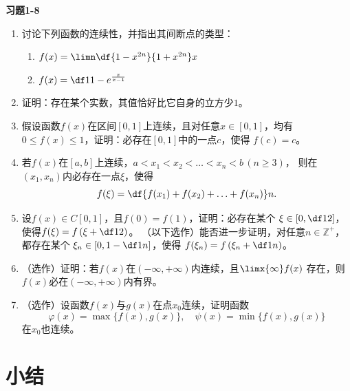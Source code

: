 \begin{ext}
	{\centering\bf 习题1-8}
	
	\begin{enumerate}  
	  \item 讨论下列函数的连续性，并指出其间断点的类型：
	  \begin{enumerate}[(1)]
	  	\item $f(x)=\limn\df{1-x^{2n}}{1+x^{2n}}x$
	  	\item $f(x)=\df1{1-e^{\frac{x}{x-1}}}$
	  \end{enumerate}
	  \item 证明：存在某个实数，其值恰好比它自身的立方少$1$。
	  \item 假设函数$f(x)$在区间$[0,1]$上连续，且对任意$x\in[0,1]$，均有
		$0\leq f(x)\leq 1$，证明：必存在$[0,1]$中的一点$c$，使得
		$f(c)=c$。
	  \item 若$f(x)$在$[a,b]$上连续，$a<x_1<x_2<\ldots<x_n<b\,(n\geq3)$，
		则在$(x_1,x_n)$内必存在一点$\xi$，使得
		$$f(\xi)=\df{f(x_1)+f(x_2)+\ldots+f(x_n)}n.$$ 
	  \item 设$f(x)\in C[0,1]$，且$f(0)=f(1)$，证明：必存在某个
	  $\xi\in\left[0,\df12\right]$，使得$f(\xi)=f\left(\xi+\df12\right)$。
	  （以下选作）能否进一步证明，对任意$n\in\mathbb{Z}^+$，都存在某个
	  $\xi_n\in\left[0,1-\df1n\right]$，使得
	  $f(\xi_n)=f\left(\xi_n+\df1n\right)$。
	  \item （选作）证明：若$f(x)$在$(-\infty,+\infty)$内连续，且$\limx{\infty}f(x)$
		存在，则$f(x)$必在$(-\infty,+\infty)$内有界。
	  \item （选作）设函数$f(x)$与$g(x)$在点$x_0$连续，证明函数
		$$\varphi(x)=\max\{f(x),g(x)\},\quad
		\psi(x)=\min\{f(x),g(x)\}$$
		在$x_0$也连续。
	\end{enumerate}
\end{ext}

\section{小结}

